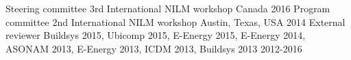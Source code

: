 \begin{cvhonors}
  \cvhonor
    {Steering committee}
    {3rd International NILM workshop}
    {Canada}
    {2016}
  \cvhonor
    {Program committee}
    {2nd International NILM workshop}
    {Austin, Texas, USA}
    {2014}
    \cvhonor
    {External reviewer}
    {Buildsys 2015, Ubicomp 2015, E-Energy 2015, E-Energy 2014, ASONAM 2013, E-Energy 2013, ICDM 2013, Buildsys 2013}
    {}
    {2012-2016}
\end{cvhonors}
